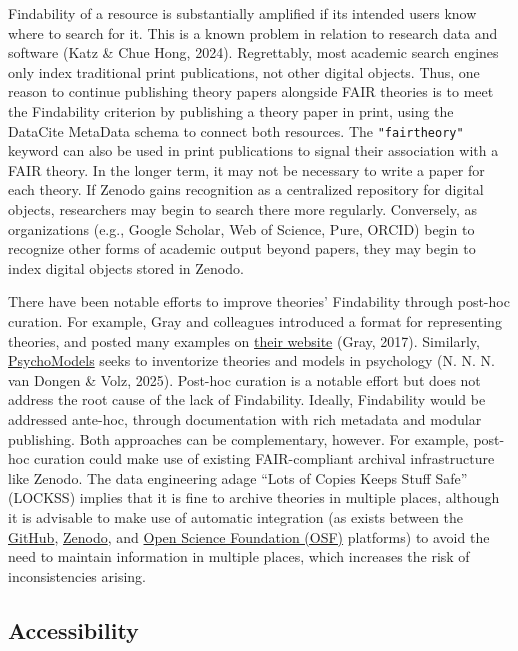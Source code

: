 \documentclass[
  man, noextraspace,floatsintext]{apa7}
\begin{document}
Findability of a resource is substantially amplified if its intended users know where to search for it.
This is a known problem in relation to research data and software (Katz \& Chue Hong, 2024).
Regrettably, most academic search engines only index traditional print publications, not other digital objects.
Thus, one reason to continue publishing theory papers alongside FAIR theories is to meet the Findability criterion by publishing a theory paper in print, using the DataCite MetaData schema to connect both resources.
The \texttt{"fairtheory"} keyword can also be used in print publications to signal their association with a FAIR theory.
In the longer term, it may not be necessary to write a paper for each theory.
If Zenodo gains recognition as a centralized repository for digital objects, researchers may begin to search there more regularly.
Conversely, as organizations (e.g., Google Scholar, Web of Science, Pure, ORCID) begin to recognize other forms of academic output beyond papers, they may begin to index digital objects stored in Zenodo.

There have been notable efforts to improve theories' Findability through post-hoc curation.
For example, Gray and colleagues introduced a format for representing theories,
and posted many examples on \href{https://www.theorymaps.org}{their website} (Gray, 2017).
Similarly, \href{http://psychomodels.org/}{PsychoModels} seeks to inventorize theories and models in psychology (N. N. N. van Dongen \& Volz, 2025).
Post-hoc curation is a notable effort but does not address the root cause of the lack of Findability.
Ideally, Findability would be addressed ante-hoc, through documentation with rich metadata and modular publishing.
Both approaches can be complementary, however.
For example, post-hoc curation could make use of existing FAIR-compliant archival infrastructure like Zenodo.
The data engineering adage ``Lots of Copies Keeps Stuff Safe'' (LOCKSS) implies that it is fine to archive theories in multiple places,
although it is advisable to make use of automatic integration (as exists between the \href{http://github.com/}{GitHub}, \href{https://zenodo.org}{Zenodo}, and \href{https://osf.io}{Open Science Foundation (OSF)} platforms)
to avoid the need to maintain information in multiple places, which increases the risk of inconsistencies arising.

\subsection{Accessibility}\label{accessibility}
\end{document}
